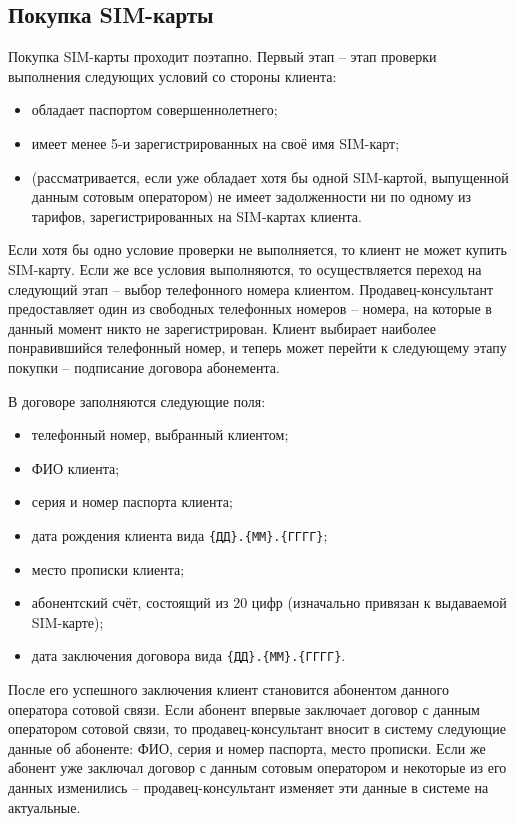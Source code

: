 \subsection{Покупка SIM-карты}


Покупка SIM-карты проходит поэтапно. Первый этап -- этап проверки выполнения следующих условий со стороны клиента:
\begin{itemize}
    \item обладает паспортом совершеннолетнего;
    \item имеет менее 5-и зарегистрированных на своё имя SIM-карт;
    \item (рассматривается, если уже обладает хотя бы одной SIM-картой, выпущенной данным сотовым оператором) не имеет задолженности ни по одному из тарифов, зарегистрированных на SIM-картах клиента.
\end{itemize}

Если хотя бы одно условие проверки не выполняется, то клиент не может купить SIM-карту. Если же все условия выполняются, то осуществляется переход на следующий этап -- выбор телефонного номера клиентом. Продавец-консультант предоставляет один из свободных телефонных номеров -- номера, на которые в данный момент никто не зарегистрирован. Клиент выбирает наиболее понравившийся телефонный номер, и теперь может перейти к следующему этапу покупки -- подписание договора абонемента.

В договоре заполняются следующие поля:
\begin{itemize}
    \item телефонный номер, выбранный клиентом;
    \item ФИО клиента;
    \item серия и номер паспорта клиента;
    \item дата рождения клиента вида \texttt{\{ДД\}.\{ММ\}.\{ГГГГ\}};
    \item место прописки клиента;
    \item абонентский счёт, состоящий из 20 цифр (изначально привязан к выдаваемой SIM-карте);
    \item дата заключения договора вида \texttt{\{ДД\}.\{ММ\}.\{ГГГГ\}}.
\end{itemize}

После его успешного заключения клиент становится абонентом данного оператора сотовой связи. Если абонент впервые заключает договор с данным оператором сотовой связи, то продавец-консультант вносит в систему следующие данные об абоненте: ФИО, серия и номер паспорта, место прописки. Если же абонент уже заключал договор с данным сотовым оператором и некоторые из его данных изменились -- продавец-консультант изменяет эти данные в системе на актуальные.

